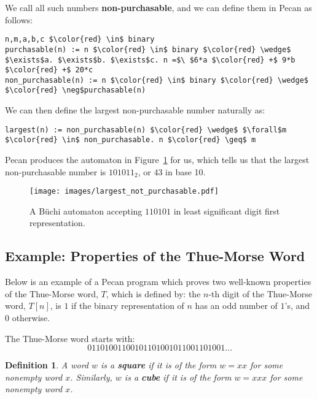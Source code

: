 \documentclass[landscape,usenames,dvipsnames]{sciposter}
\newtheorem*{defin}{Definition}
\begin{document}
\begin{multicols}{3}
We call all such numbers \textbf{non-purchasable}, and we can define them in Pecan as follows:

\begin{lstlisting}[language=pecan, basicstyle=\normalsize\ttfamily, mathescape=true, frame=single]
n,m,a,b,c $\color{red} \in$ binary
purchasable(n) := n $\color{red} \in$ binary $\color{red} \wedge$ $\exists$a. $\exists$b. $\exists$c. n =$\ $6*a $\color{red} +$ 9*b $\color{red} +$ 20*c
non_purchasable(n) := n $\color{red} \in$ binary $\color{red} \wedge$ $\color{red} \neg$purchasable(n)
\end{lstlisting}

We can then define the largest non-purchasable number naturally as:
\begin{lstlisting}[language=pecan, basicstyle=\normalsize\ttfamily, mathescape=true, frame=single]
largest(n) := non_purchasable(n) $\color{red} \wedge$ $\forall$m $\color{red} \in$ non_purchasable. n $\color{red} \geq$ m
\end{lstlisting}

Pecan produces the automaton in Figure~\ref{fig:largest_non_purchasable} for us, which tells us that the largest non-purchasable number is $101011_2$, or $43$ in base 10.

\begin{figure}
    \centering
    \texttt{[image: images/largest\_not\_purchasable.pdf]}
    \caption{A B\"uchi automaton accepting $110101$ in least significant digit first representation.}
    \label{fig:largest_non_purchasable}
\end{figure}

\columnbreak

\begin{mdframed}[style=MyFrame]
\subsection*{Example: Properties of the Thue-Morse Word}
\end{mdframed}

Below is an example of a Pecan program which proves two well-known properties of the Thue-Morse word, $T$, which is defined by: the $n$-th digit of the Thue-Morse word, $T[n]$, is $1$ if the binary representation of $n$ has an odd number of $1$'s, and $0$ otherwise.

The Thue-Morse word starts with: {\Large\[ 01101001100101101001011001101001\dots  \]}
\begin{defin}
    A word $w$ is a \textbf{square} if it is of the form $w = xx$ for some nonempty word $x$.
    Similarly, $w$ is a \textbf{cube} if it is of the form $w = xxx$ for some nonempty word $x$.
\end{defin}


\end{multicols}
\end{document}
